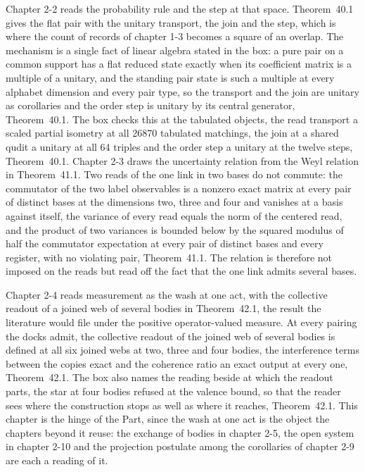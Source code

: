 Chapter 2-2 reads the probability rule and the step at that space. Theorem~40.1 gives the flat pair with the unitary transport, the join and the step, which is where the count of records of chapter 1-3 becomes a square of an overlap. The mechanism is a single fact of linear algebra stated in the box: a pure pair on a common support has a flat reduced state exactly when its coefficient matrix is a multiple of a unitary, and the standing pair state is such a multiple at every alphabet dimension and every pair type, so the transport and the join are unitary as corollaries and the order step is unitary by its central generator, Theorem~40.1. The box checks this at the tabulated objects, the read transport a scaled partial isometry at all 26870 tabulated matchings, the join at a shared qudit a unitary at all 64 triples and the order step a unitary at the twelve steps, Theorem~40.1. Chapter 2-3 draws the uncertainty relation from the Weyl relation in Theorem~41.1. Two reads of the one link in two bases do not commute: the commutator of the two label observables is a nonzero exact matrix at every pair of distinct bases at the dimensions two, three and four and vanishes at a basis against itself, the variance of every read equals the norm of the centered read, and the product of two variances is bounded below by the squared modulus of half the commutator expectation at every pair of distinct bases and every register, with no violating pair, Theorem~41.1. The relation is therefore not imposed on the reads but read off the fact that the one link admits several bases.

Chapter 2-4 reads measurement as the wash at one act, with the collective readout of a joined web of several bodies in Theorem~42.1, the result the literature would file under the positive operator-valued measure. At every pairing the docks admit, the collective readout of the joined web of several bodies is defined at all six joined webs at two, three and four bodies, the interference terms between the copies exact and the coherence ratio an exact output at every one, Theorem~42.1. The box also names the reading beside at which the readout parts, the star at four bodies refused at the valence bound, so that the reader sees where the construction stops as well as where it reaches, Theorem~42.1. This chapter is the hinge of the Part, since the wash at one act is the object the chapters beyond it reuse: the exchange of bodies in chapter 2-5, the open system in chapter 2-10 and the projection postulate among the corollaries of chapter 2-9 are each a reading of it.


